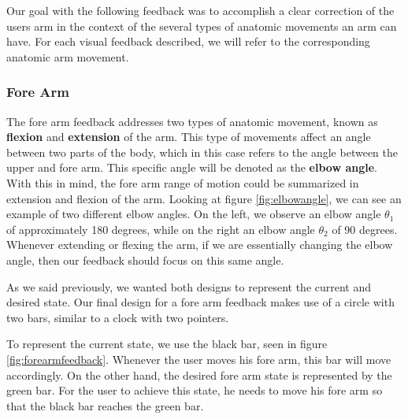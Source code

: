 Our goal with the following feedback was to accomplish a clear correction of the users arm in the context of the several types of anatomic movements an arm can have. 
For each visual feedback described, we will refer to the corresponding anatomic arm movement.

\subsubsection{Fore Arm}

The fore arm feedback addresses two types of anatomic movement, known as \textbf{flexion} and \textbf{extension} of the arm. 
This type of movements affect an angle between two parts of the body, which in this case refers to the angle between the upper and fore arm. 
This specific angle will be denoted as the \textbf{elbow angle}.
With this in mind, the fore arm range of motion could be summarized in extension and flexion of the arm.
Looking at figure \ref{fig:elbowangle}, we can see an example of two different elbow angles. 
On the left, we observe an elbow angle $\theta$$_1$ of approximately 180 degrees, while on the right an elbow angle $\theta$$_2$ of 90 degrees.  
Whenever extending or flexing the arm, if we are essentially changing the elbow angle, then our feedback should focus on this same angle.

As we said previously, we wanted both designs to represent the current and desired state. 
Our final design for a fore arm feedback makes use of a circle with two bars, similar to a clock with two pointers.



To represent the current state, we use the black bar, seen in figure \ref{fig:forearmfeedback}. Whenever the user moves his fore arm, this bar will move accordingly.
On the other hand, the desired fore arm state is represented by the green bar. 
For the user to achieve this state, he needs to move his fore arm so that the black bar reaches the green bar.

